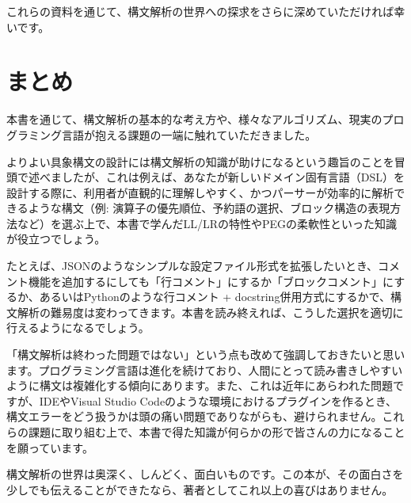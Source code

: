 これらの資料を通じて、構文解析の世界への探求をさらに深めていただければ幸いです。

\hypertarget{chapter8-ux307eux3068ux3081}{%
\section{まとめ}\label{chapter8-ux307eux3068ux3081}}

本書を通じて、構文解析の基本的な考え方や、様々なアルゴリズム、現実のプログラミング言語が抱える課題の一端に触れていただきました。

よりよい具象構文の設計には構文解析の知識が助けになるという趣旨のことを冒頭で述べましたが、これは例えば、あなたが新しいドメイン固有言語（DSL）を設計する際に、利用者が直観的に理解しやすく、かつパーサーが効率的に解析できるような構文（例:
演算子の優先順位、予約語の選択、ブロック構造の表現方法など）を選ぶ上で、本書で学んだLL/LRの特性やPEGの柔軟性といった知識が役立つでしょう。

たとえば、JSONのようなシンプルな設定ファイル形式を拡張したいとき、コメント機能を追加するにしても「行コメント」にするか「ブロックコメント」にするか、あるいはPythonのような行コメント + docstring併用方式にするかで、構文解析の難易度は変わってきます。本書を読み終えれば、こうした選択を適切に行えるようになるでしょう。

「構文解析は終わった問題ではない」という点も改めて強調しておきたいと思います。プログラミング言語は進化を続けており、人間にとって読み書きしやすいように構文は複雑化する傾向にあります。また、これは近年にあらわれた問題ですが、IDEやVisual Studio Codeのような環境におけるプラグインを作るとき、構文エラーをどう扱うかは頭の痛い問題でありながらも、避けられません。これらの課題に取り組む上で、本書で得た知識が何らかの形で皆さんの力になることを願っています。

構文解析の世界は奥深く、しんどく、面白いものです。この本が、その面白さを少しでも伝えることができたなら、著者としてこれ以上の喜びはありません。

